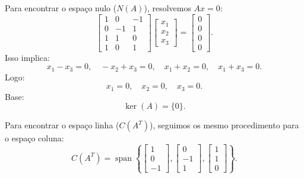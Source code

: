 \begin{resolution}
\begin{enumerate}[label=\alph*)]
          Para encontrar o espaço nulo (\( N(A) \)), resolvemos \( A x = 0 \):
          \[
            \begin{bmatrix}
              1 & 0  & -1 \\
              0 & -1 & 1  \\
              1 & 1  & 0  \\
              1 & 0  & 1
            \end{bmatrix}
            \begin{bmatrix}
              x_1 \\ x_2 \\ x_3
            \end{bmatrix} =
            \begin{bmatrix}
              0 \\ 0 \\ 0 \\ 0
            \end{bmatrix}.
          \]
          Isso implica:
          \[
            x_1 - x_3= 0, \quad -x_2 + x_3 = 0, \quad x_1 + x_2 = 0, \quad x_1 + x_3 = 0.
          \]
          Logo:
          \[
            x_1 = 0, \quad x_2 = 0, \quad x_3 = 0.
          \]
          Base:
          \[
            \operatorname{ker}(A) =  \{0\}.
          \]

          Para encontrar o espaço linha (\( C(A^T) \)), seguimos os mesmo procedimento para o espaço coluna:
          \[
            C(A^T) = \operatorname{span}\left\{
            \begin{bmatrix} 1 \\ 0 \\ -1 \end{bmatrix},
            \begin{bmatrix} 0 \\ -1 \\ 1 \end{bmatrix},
            \begin{bmatrix} 1 \\ 1 \\ 0 \end{bmatrix}
            \right\}.
          \]


\end{enumerate}
\end{resolution}
